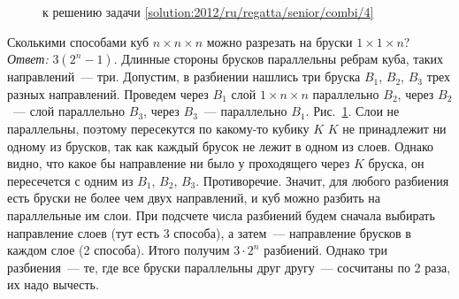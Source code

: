\ifsolution
\begin{figure}\centering
    \caption{к решению задачи \ref{solution:2012/ru/regatta/senior/combi/4}}
    \label{fig:solution:2012/ru/regatta/senior/combi/4}
\end{figure}
\fi %

\problem
Сколькими способами куб $n \times n \times n$ можно разрезать на бруски
$1 \times 1 \times n$?
\solution
\label{solution:2012/ru/regatta/senior/combi/4}%
\emph{Ответ:} $3(2^n - 1)$.
Длинные стороны брусков параллельны ребрам куба, таких направлений~--- три.
Допустим, в разбиении нашлись три бруска $B_1$, $B_2$, $B_3$ трех разных
направлений.
Проведем через $B_1$ слой $1 \times n \times n$ параллельно $B_2$,
через $B_2$~--- слой параллельно $B_3$, через $B_3$~--- параллельно $B_1$.
Рис.~\ref{fig:solution:2012/ru/regatta/senior/combi/4}.
Слои не параллельны, поэтому пересекутся по какому-то кубику $K$
$K$ не принадлежит ни одному из брусков, так как каждый брусок не лежит в
одном из слоев.
Однако видно, что какое бы направление ни было у проходящего через $K$ бруска,
он пересечется с одним из $B_1$, $B_2$, $B_3$.
Противоречие.
Значит, для любого разбиения есть бруски не более чем двух направлений, и куб
можно разбить на параллельные им слои.
При подсчете числа разбиений будем сначала выбирать направление слоев
(тут есть 3 способа), а затем~--- направление брусков в каждом слое
(2 способа).
Итого получим $3 \cdot 2^n$ разбиений.
Однако три разбиения~--- те, где все бруски параллельны друг другу~---
сосчитаны по 2 раза, их надо вычесть.
\endproblem
